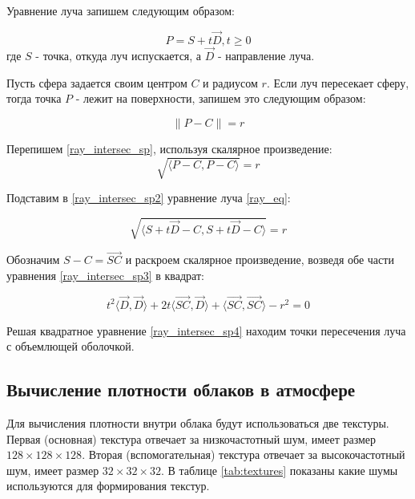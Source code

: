 Уравнение луча запишем следующим образом:

\begin{equation}
	\label{ray_eq}
	P = S + t \vec{D}, t \ge 0
\end{equation}
где $ S $ - точка, откуда луч испускается, а $ \vec{D} $ - направление луча.

Пусть сфера задается своим центром $ C $ и радиусом $ r $. Если луч пересекает сферу, тогда точка $ P $ - лежит на поверхности, запишем это следующим образом:

\begin{equation}
	\label{ray_intersec_sp}
	\| P - C \| = r
\end{equation}

Перепишем \eqref{ray_intersec_sp}, используя скалярное произведение:
\begin{equation}
	\label{ray_intersec_sp2}
	\sqrt{\langle P - C , P - C \rangle} = r
\end{equation}

Подставим в \eqref{ray_intersec_sp2} уравнение луча \eqref{ray_eq}:

\begin{equation}
	\label{ray_intersec_sp3}
	\sqrt{\langle S + t \vec{D} - C , S + t \vec{D} - C \rangle} = r
\end{equation}

Обозначим $ S - C = \vec{SC} $ и раскроем скалярное произведение, возведя обе части уравнения \eqref{ray_intersec_sp3} в квадрат:

\begin{equation}
	\label{ray_intersec_sp4}
	t ^ 2 \langle \vec{D}, \vec{D} \rangle + 2t \langle \vec{SC}, \vec{D} \rangle + \langle \vec{SC}, \vec{SC} \rangle - r ^ 2 = 0
\end{equation}

Решая квадратное уравнение \eqref{ray_intersec_sp4} находим точки пересечения луча с объемлющей оболочкой.

\subsection{Вычисление плотности облаков в атмосфере}

Для вычисления плотности внутри облака будут использоваться две текстуры.
Первая (основная) текстура отвечает за низкочастотный шум, имеет размер $ 128 \times 128 \times 128 $. Вторая (вспомогательная) текстура отвечает за высокочастотный шум, имеет размер $ 32 \times 32 \times 32 $. 
В таблице \ref{tab:textures} показаны какие шумы используются для формирования текстур.


